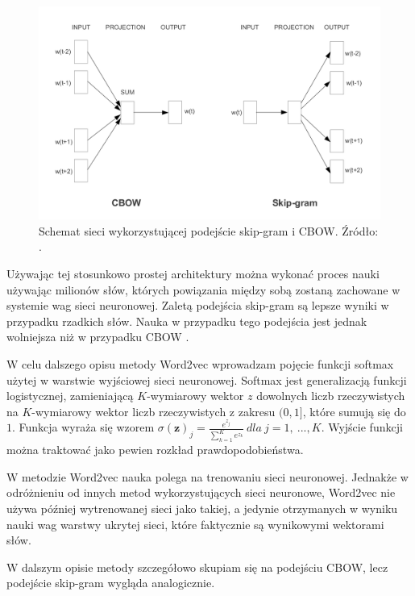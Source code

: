 \documentclass[pl]{minipw} %
\begin{document}
\begin{figure}[H]
	\centering
	\includegraphics[width=1\textwidth]{img/skipgram_cbow.png}
	\caption{Schemat sieci wykorzystującej podejście skip-gram i CBOW. Źródło: \cite{word2vec}.}
\end{figure}
Używając tej stosunkowo prostej architektury można wykonać proces nauki używając milionów słów, których powiązania między sobą zostaną zachowane w systemie wag sieci neuronowej. Zaletą podejścia skip-gram są lepsze wyniki w przypadku rzadkich słów. Nauka w przypadku tego podejścia jest jednak wolniejsza niż w przypadku CBOW \cite{google_word2vec}.

W celu dalszego opisu metody Word2vec wprowadzam pojęcie funkcji softmax użytej w warstwie wyjściowej sieci neuronowej. Softmax jest generalizacją funkcji logistycznej, zamieniającą $K$-wymiarowy wektor $z$ dowolnych liczb rzeczywistych na $K$-wymiarowy wektor liczb rzeczywistych z zakresu $(0,1]$, które sumują się do $1$. Funkcja wyraża się wzorem $\sigma (\mathbf {z} )_{j}={\frac {e^{z_{j}}}{\sum _{k=1}^{K}e^{z_{k}}}}\ dla\ j=1,\ ...,K$. Wyjście funkcji można traktować jako pewien rozkład prawdopodobieństwa.

W metodzie Word2vec nauka polega na trenowaniu sieci neuronowej. Jednakże w odróżnieniu od innych metod wykorzystujących sieci neuronowe, Word2vec nie używa później wytrenowanej sieci jako takiej, a jedynie otrzymanych w wyniku nauki wag warstwy ukrytej sieci, które faktycznie są wynikowymi wektorami słów.

W dalszym opisie metody szczegółowo skupiam się na podejściu CBOW, lecz podejście skip-gram wygląda analogicznie.
\end{document}
